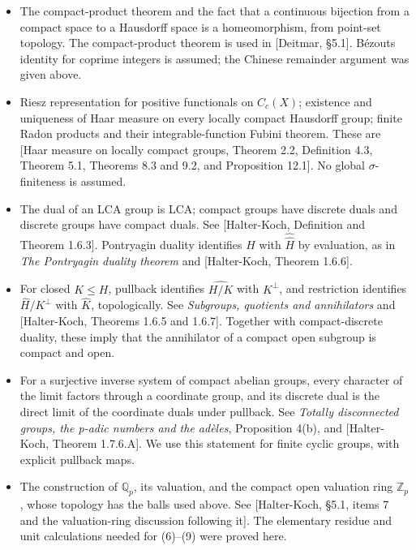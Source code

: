\documentclass[
  english,
  11pt,
  a4paper,
]{article}
\providecommand{\tightlist}{%
  \setlength{\itemsep}{0pt}\setlength{\parskip}{0pt}}
\begin{document}
\begin{itemize}
\tightlist
\item
  The compact-product theorem and the fact that a continuous bijection
  from a compact space to a Hausdorff space is a homeomorphism, from
  point-set topology. The compact-product theorem is used in {[}Deitmar,
  §5.1{]}. Bézout\textquotesingle s identity for coprime integers is
  assumed; the Chinese remainder argument was given above.
\item
  Riesz representation for positive functionals on \(C_c(X)\); existence
  and uniqueness of Haar measure on every locally compact Hausdorff
  group; finite Radon products and their integrable-function Fubini
  theorem. These are {[}Haar measure on locally compact groups, Theorem
  2.2, Definition 4.3, Theorem 5.1, Theorems 8.3 and 9.2, and
  Proposition 12.1{]}. No global \(\sigma\)-finiteness is assumed.
\item
  The dual of an LCA group is LCA; compact groups have discrete duals
  and discrete groups have compact duals. See {[}Halter-Koch, Definition
  and Theorem 1.6.3{]}. Pontryagin duality identifies \(H\) with
  \(\widehat{\widehat H}\) by evaluation, as in \emph{The Pontryagin
  duality theorem} and {[}Halter-Koch, Theorem 1.6.6{]}.
\item
  For closed \(K\leq H\), pullback identifies \(\widehat{H/K}\) with
  \(K^\perp\), and restriction identifies \(\widehat H/K^\perp\) with
  \(\widehat K\), topologically. See \emph{Subgroups, quotients and
  annihilators} and {[}Halter-Koch, Theorems 1.6.5 and 1.6.7{]}.
  Together with compact-discrete duality, these imply that the
  annihilator of a compact open subgroup is compact and open.
\item
  For a surjective inverse system of compact abelian groups, every
  character of the limit factors through a coordinate group, and its
  discrete dual is the direct limit of the coordinate duals under
  pullback. See \emph{Totally disconnected groups, the p-adic numbers
  and the adèles}, Proposition 4(b), and {[}Halter-Koch, Theorem
  1.7.6.A{]}. We use this statement for finite cyclic groups, with
  explicit pullback maps.
\item
  The construction of \(\mathbb Q_p\), its valuation, and the compact
  open valuation ring \(\mathbb Z_p\), whose topology has the balls used
  above. See {[}Halter-Koch, §5.1, items 7 and the valuation-ring
  discussion following it{]}. The elementary residue and unit
  calculations needed for (6)--(9) were proved here.
\end{itemize}
\end{document}
